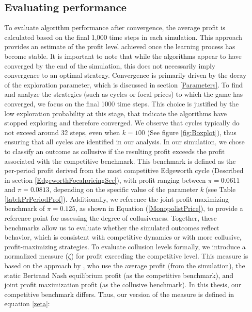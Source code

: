 \documentclass{article}
\begin{document}
\subsection{Evaluating performance}
To evaluate algorithm performance after convergence, the average profit is calculated based on the final 1,000 time steps in each simulation. This approach provides an estimate of the profit level achieved once the learning process has become stable. It is important to note that while the algorithms appear to have converged by the end of the simulation, this does not necessarily imply convergence to an optimal strategy. Convergence is primarily driven by the decay of the exploration parameter, which is discussed in section \ref{Parameters}.
\newline
To find and analyze the strategies (such as cycles or focal prices) to which the game has converged, we focus on the final 1000 time steps. This choice is justified by the low exploration probability at this stage, that indicate the algorithms have stopped exploring and therefore converged. We observe that cycles typically do not exceed around 32 steps, even when $k=100$ (See figure \ref{fig:Boxplot}), thus ensuring that all cycles are identified in our analysis.
\newline
In our simulation, we chose to classify an outcome as collusive if the resulting profit exceeds the profit associated with the competitive benchmark. This benchmark is defined as the per-period profit derived from the most competitive Edgeworth cycle (Described in section \ref{EdgeworthFocalpricingSec}), with profit ranging between $\pi = 0.0611$ and $\pi = 0.0813$, depending on the specific value of the parameter \textit{k} (see Table \ref{tab:kPrPeriodProf}). Additionally, we reference the joint profit-maximizing benchmark of $\pi = 0.125$, as shown in Equation (\ref{MonopolistPrice}), to provide a reference point for assessing the degree of collusiveness. Together, these benchmarks allow us to evaluate whether the simulated outcomes reflect behavior, which is consistent with competitive dynamics or with more collusive, profit-maximizing strategies.
\newline
To evaluate collusion levels formally, we introduce a normalized measure (\(\zeta\)) for profit exceeding the competitive level. This measure is based on the approach by \cite{Calvano}, who use the average profit (from the simulation), the static Bertrand Nash equilibrium profit (as the competitive benchmark), and joint profit maximization profit (as the collusive benchmark). In this thesis, our competitive benchmark differs. Thus, our version of the measure is defined in equation \ref{zeta}:
\end{document}
